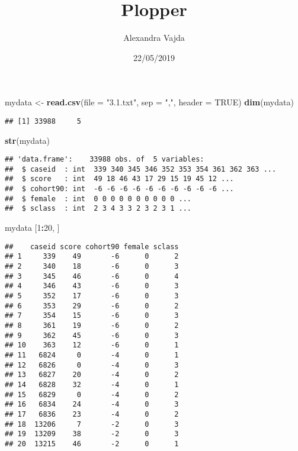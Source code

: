 \documentclass[]{article}
\title{Plopper}
\author{Alexandra Vajda}
\date{22/05/2019}
\newenvironment{Shaded}{\begin{snugshade}}{\end{snugshade}}
\newcommand{\KeywordTok}[1]{\textcolor[rgb]{0.13,0.29,0.53}{\textbf{#1}}}
\newcommand{\DataTypeTok}[1]{\textcolor[rgb]{0.13,0.29,0.53}{#1}}
\newcommand{\DecValTok}[1]{\textcolor[rgb]{0.00,0.00,0.81}{#1}}
\newcommand{\StringTok}[1]{\textcolor[rgb]{0.31,0.60,0.02}{#1}}
\newcommand{\OtherTok}[1]{\textcolor[rgb]{0.56,0.35,0.01}{#1}}
\newcommand{\OperatorTok}[1]{\textcolor[rgb]{0.81,0.36,0.00}{\textbf{#1}}}
\newcommand{\NormalTok}[1]{#1}
\begin{document}
\maketitle

\begin{Shaded}
\begin{Highlighting}[]
\NormalTok{mydata <-}\StringTok{ }\KeywordTok{read.csv}\NormalTok{(}\DataTypeTok{file =} \StringTok{"3.1.txt"}\NormalTok{, }\DataTypeTok{sep =} \StringTok{","}\NormalTok{, }\DataTypeTok{header =} \OtherTok{TRUE}\NormalTok{)}
\KeywordTok{dim}\NormalTok{(mydata)}
\end{Highlighting}
\end{Shaded}

\begin{verbatim}
## [1] 33988     5
\end{verbatim}

\begin{Shaded}
\begin{Highlighting}[]
\KeywordTok{str}\NormalTok{(mydata)}
\end{Highlighting}
\end{Shaded}

\begin{verbatim}
## 'data.frame':    33988 obs. of  5 variables:
##  $ caseid  : int  339 340 345 346 352 353 354 361 362 363 ...
##  $ score   : int  49 18 46 43 17 29 15 19 45 12 ...
##  $ cohort90: int  -6 -6 -6 -6 -6 -6 -6 -6 -6 -6 ...
##  $ female  : int  0 0 0 0 0 0 0 0 0 0 ...
##  $ sclass  : int  2 3 4 3 3 2 3 2 3 1 ...
\end{verbatim}

\begin{Shaded}
\begin{Highlighting}[]
\NormalTok{mydata [}\DecValTok{1}\OperatorTok{:}\DecValTok{20}\NormalTok{, ]}
\end{Highlighting}
\end{Shaded}

\begin{verbatim}
##    caseid score cohort90 female sclass
## 1     339    49       -6      0      2
## 2     340    18       -6      0      3
## 3     345    46       -6      0      4
## 4     346    43       -6      0      3
## 5     352    17       -6      0      3
## 6     353    29       -6      0      2
## 7     354    15       -6      0      3
## 8     361    19       -6      0      2
## 9     362    45       -6      0      3
## 10    363    12       -6      0      1
## 11   6824     0       -4      0      1
## 12   6826     0       -4      0      3
## 13   6827    20       -4      0      2
## 14   6828    32       -4      0      1
## 15   6829     0       -4      0      2
## 16   6834    24       -4      0      3
## 17   6836    23       -4      0      2
## 18  13206     7       -2      0      3
## 19  13209    38       -2      0      3
## 20  13215    46       -2      0      1
\end{verbatim}
\end{document}
